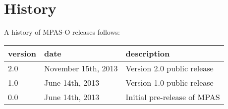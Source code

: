 \chapter*{History}
\label{chap:history}

A history of MPAS-O releases follows: \\


\begin{tabular}{lll} 
\hline\hline version & date & description  \\
\hline 
2.0 & November 15th, 2013 & Version 2.0 public release \\
\hline 
1.0 & June 14th, 2013 & Version 1.0 public release \\
\hline 
0.0 & June 14th, 2013 & Initial pre-release of MPAS \\
\hline 
\end{tabular} 


\newpage
